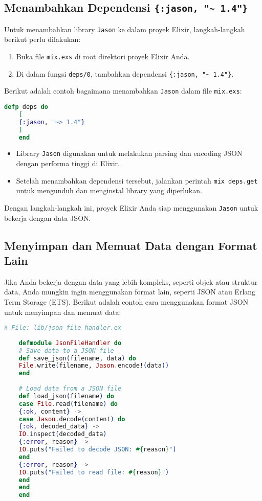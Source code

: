 \subsection{Menambahkan Dependensi \texttt{\{:jason, "\textasciitilde{} 1.4"\}}}

Untuk menambahkan library \texttt{Jason} ke dalam proyek Elixir, langkah-langkah berikut perlu dilakukan:

\begin{enumerate}
	\item Buka file \texttt{mix.exs} di root direktori proyek Elixir Anda.
	\item Di dalam fungsi \texttt{deps/0}, tambahkan dependensi \texttt{\{:jason, "\textasciitilde{} 1.4"\}}.
\end{enumerate}

Berikut adalah contoh bagaimana menambahkan \texttt{Jason} dalam file \texttt{mix.exs}:

\begin{lstlisting}[language=Elixir]
	defp deps do
	[
	{:jason, "~> 1.4"}
	]
	end
\end{lstlisting}

\begin{itemize}
	\item Library \texttt{Jason} digunakan untuk melakukan parsing dan encoding JSON dengan performa tinggi di Elixir.
	\item Setelah menambahkan dependensi tersebut, jalankan perintah \texttt{mix deps.get} untuk mengunduh dan menginstal library yang diperlukan.
\end{itemize}

Dengan langkah-langkah ini, proyek Elixir Anda siap menggunakan \texttt{Jason} untuk bekerja dengan data JSON.

\subsection{Menyimpan dan Memuat Data dengan Format Lain}

Jika Anda bekerja dengan data yang lebih kompleks, seperti objek atau struktur data, Anda mungkin ingin menggunakan format lain, seperti JSON atau Erlang Term Storage (ETS). Berikut adalah contoh cara menggunakan format JSON untuk menyimpan dan memuat data:

\begin{lstlisting}[language=Elixir]
	# File: lib/json_file_handler.ex
	
	defmodule JsonFileHandler do
	# Save data to a JSON file
	def save_json(filename, data) do
	File.write(filename, Jason.encode!(data))
	end
	
	# Load data from a JSON file
	def load_json(filename) do
	case File.read(filename) do
	{:ok, content} ->
	case Jason.decode(content) do
	{:ok, decoded_data} ->
	IO.inspect(decoded_data)
	{:error, reason} ->
	IO.puts("Failed to decode JSON: #{reason}")
	end
	{:error, reason} ->
	IO.puts("Failed to read file: #{reason}")
	end
	end
	end

\end{lstlisting}



